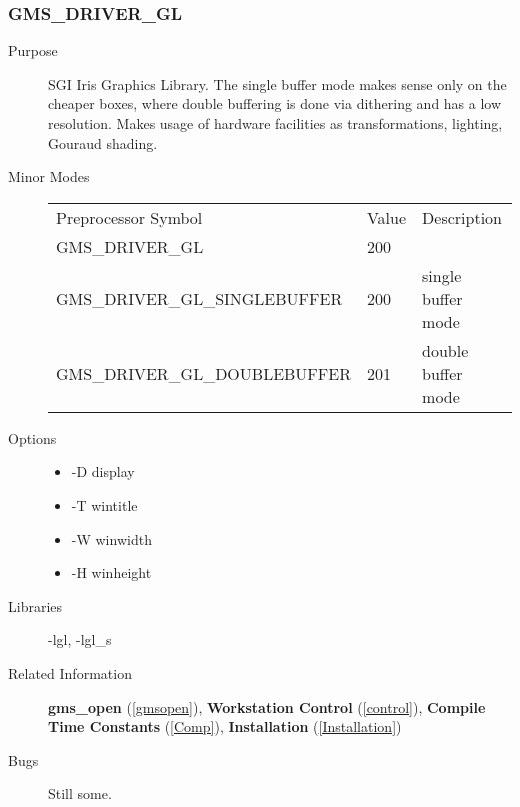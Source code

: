 \subsubsection{GMS\_DRIVER\_GL\label{gl}}
\begin{description}
\item[Purpose]\mbox{}


SGI Iris Graphics Library. The single buffer mode
makes sense only on  the cheaper boxes, where double buffering
is done via dithering and has a low resolution.
 Makes usage of hardware facilities as transformations,
lighting, Gouraud shading.

\item[Minor Modes]\mbox{}


\begin{center}
\begin{tabular}{lll}\hline
Preprocessor Symbol & Value& Description\\ 
GMS\_DRIVER\_GL & 200 & \\ 
GMS\_DRIVER\_GL\_SINGLEBUFFER & 200 & single buffer mode\\ 
GMS\_DRIVER\_GL\_DOUBLEBUFFER & 201 & double buffer mode\\ 
\hline\end{tabular}
\end{center}

\item[Options]\mbox{}


\begin{itemize}
\item  -D display 
\item  -T wintitle 
\item  -W winwidth   
\item  -H winheight 
\end{itemize}

\item[Libraries]\mbox{}


-lgl, -lgl\_s
\item[Related Information]\mbox{}


{\bf gms\_open} (\ref{gmsopen}), 
{\bf Workstation Control} (\ref{control}), 
{\bf Compile Time Constants} (\ref{Comp}), 
{\bf Installation} (\ref{Installation}) 
\item[Bugs]\mbox{}


Still some.
\end{description}





\newpage



